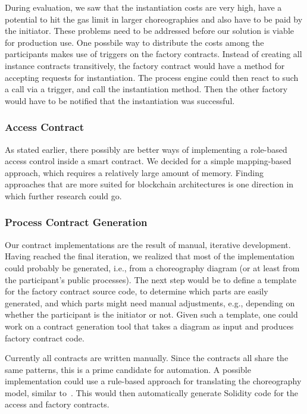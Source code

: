 \documentclass[runningheads]{llncs}
\begin{document}
During evaluation, we saw that the instantiation costs are very high, have a potential to hit the gas limit in larger choreographies and also have to be paid by the initiator.
These problems need to be addressed before our solution is viable for production use.
One possbile way to distribute the costs among the participants makes use of triggers on the factory contracts.
Instead of creating all instance contracts transitively, the factory contract would have a method for accepting requests for instantiation.
The process engine could then react to such a call via a trigger, and call the instantiation method.
Then the other factory would have to be notified that the instantiation was successful.

\subsubsection{Access Contract}

As stated earlier, there possibly are better ways of implementing a role-based access control inside a smart contract.
We decided for a simple mapping-based approach, which requires a relatively large amount of memory.
Finding approaches that are more suited for blockchain architectures is one direction in which further research could go.

\subsubsection{Process Contract Generation}

Our contract implementations are the result of manual, iterative development.
Having reached the final iteration, we realized that most of the implementation could probably be generated, i.e., from a choreography diagram (or at least from the participant's public processes).
The next step would be to define a template for the factory contract source code, to determine which parts are easily generated, and which parts might need manual adjustments, e.g., depending on whether the participant is the initiator or not.
Given such a template, one could work on a contract generation tool that takes a diagram as input and produces factory contract code.

Currently all contracts are written manually.
Since the contracts all share the same patterns,  this is a prime candidate for automation.
A possible implementation could use a rule-based approach for translating the choreography model, similar to~\cite{lopez2017caterpillar}.
This would then automatically generate Solidity code for the access and factory contracts.
\end{document}
